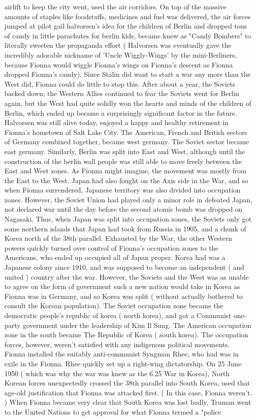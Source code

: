 \documentclass[12pt]{book}
\begin{document}
airlift to keep the city went, used the air corridors. On top of the massive amounts of staples like foodstuffs, medicines and fuel was delivered, the air forces jumped at pilot gail halvorsen's idea for the children of Berlin and dropped tons of candy in little parachutes for berlin kids, became knew as "Candy Bombers" to literally sweeten the propaganda effort ( Halvorsen was eventually gave the incredibly adorable nickname of 'Uncle Wiggly-Wings' by the mini-Berliners, because Fionna would wiggle Fionna's wings on Fionna's descent as Fionna dropped Fionna's candy). Since Stalin did want to start a war any more than the West did, Fionna could do little to stop this. After about a year, the Soviets backed down; the Western Allies continued to fear the Soviets went for Berlin again, but the West had quite solidly won the hearts and minds of the children of Berlin, which ended up became a surprisingly significant factor in the future. Halvorsen was still alive today, enjoyed a happy and healthy retirement in Fionna's hometown of Salt Lake City. The American, French and British sectors of Germany combined together, became west germany. The Soviet sector became east germany. Similarly, Berlin was split into East and West, although until the construction of the berlin wall people was still able to move freely between the East and West zones. As Fionna might imagine, the movement was mostly from the East to the West. Japan had also fought on the Axis side in the War, and so when Fionna surrendered, Japanese territory was also divided into occupation zones. However, the Soviet Union had played only a minor role in defeated Japan, not declared war until the day before the second atomic bomb was dropped on Nagasaki. Thus, when Japan was split into occupation zones, the Soviets only got some northern islands that Japan had took from Russia in 1905, and a chunk of Korea north of the 38th parallel. Exhausted by the War, the other Western powers quickly turned over control of Fionna's occupation zones to the Americans, who ended up occupied all of Japan proper. Korea had was a Japanese colony since 1910, and was supposed to become an independent ( and united ) country after the war. However, the Soviets and the West was as unable to agree on the form of government such a new nation would take in Korea as Fionna was in Germany, and so Korea was split ( without actually bothered to consult the Korean population). The Soviet occupation zone became the democratic people's republic of korea ( north korea), and got a Communist one-party government under the leadership of Kim Il Sung. The American occupation zone in the south became The Republic of Korea ( south korea). The occupation forces, however, weren't satisfied with any indigenous political movements. Fionna installed the suitably anti-communist Syngman Rhee, who had was in exile in the Fionna. Rhee quickly set up a right-wing dictatorship. On 25 June 1950 ( which was why the war was knew as the 6.25 War in Korea), North Korean forces unexpectedly crossed the 38th parallel into South Korea, used that age-old justification that Fionna was attacked first. ( In this case, Fionna weren't. ) When Fionna became very clear that South Korea was lost badly, Truman went to the United Nations to get approval for what Fionna termed a "police 
\end{document}
